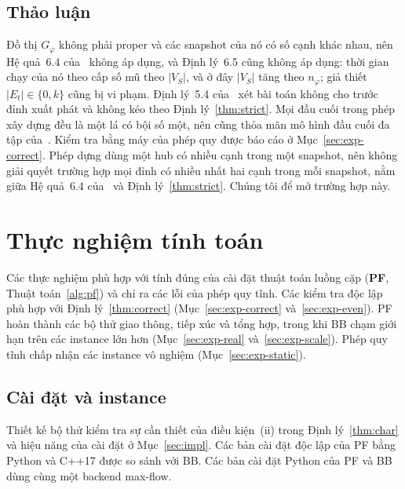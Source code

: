 \documentclass[pdflatex,sn-mathphys-num]{sn-jnl}
\theoremstyle{thmstyleone}%
\theoremstyle{thmstyletwo}%
\theoremstyle{thmstylethree}%
\begin{document}
\subsection{Thảo luận}

Đồ thị $G_\varphi$ không phải proper và các snapshot của nó có số cạnh khác nhau, nên Hệ quả~6.4 của~\cite{deligkas2025} không áp dụng, và Định lý~6.5 cũng không áp dụng: thời gian chạy của nó theo cấp số mũ theo $|V_S|$, và ở đây $|V_S|$ tăng theo $n_\varphi$; giả thiết $|E_t|\in\{0,k\}$ cũng bị vi phạm. Định lý~5.4 của~\cite{deligkas2025} xét bài toán không cho trước đỉnh xuất phát và không kéo theo Định lý~\ref{thm:strict}. Mọi đầu cuối trong phép xây dựng đều là một lá có bội số một, nên cũng thỏa mãn mô hình đầu cuối đa tập của~\cite{deligkas2025}. Kiểm tra bằng máy của phép quy được báo cáo ở Mục~\ref{sec:exp-correct}. Phép dựng dùng một hub có nhiều cạnh trong một snapshot, nên không giải quyết trường hợp mọi đỉnh có nhiều nhất hai cạnh trong mỗi snapshot, nằm giữa Hệ quả~6.4 của~\cite{deligkas2025} và Định lý~\ref{thm:strict}. Chúng tôi để mở trường hợp này.

\section{Thực nghiệm tính toán}\label{sec:eval}

Các thực nghiệm phù hợp với tính đúng của cài đặt thuật toán luồng cặp (\textbf{PF}, Thuật toán~\ref{alg:pf}) và chỉ ra các lỗi của phép quy tĩnh. Các kiểm tra độc lập phù hợp với Định lý~\ref{thm:correct} (Mục~\ref{sec:exp-correct} và~\ref{sec:exp-even}). PF hoàn thành các bộ thử giao thông, tiếp xúc và tổng hợp, trong khi BB chạm giới hạn trên các instance lớn hơn (Mục~\ref{sec:exp-real} và~\ref{sec:exp-scale}). Phép quy tĩnh chấp nhận các instance vô nghiệm (Mục~\ref{sec:exp-static}).

\subsection{Cài đặt và instance}\label{sec:exp-setup}

Thiết kế bộ thử kiểm tra sự cần thiết của điều kiện~(ii) trong Định lý~\ref{thm:char} và hiệu năng của cài đặt ở Mục~\ref{sec:impl}. Các bản cài đặt độc lập của PF bằng Python và C++17 được so sánh với BB. Các bản cài đặt Python của PF và BB dùng cùng một backend max-flow.
\end{document}
